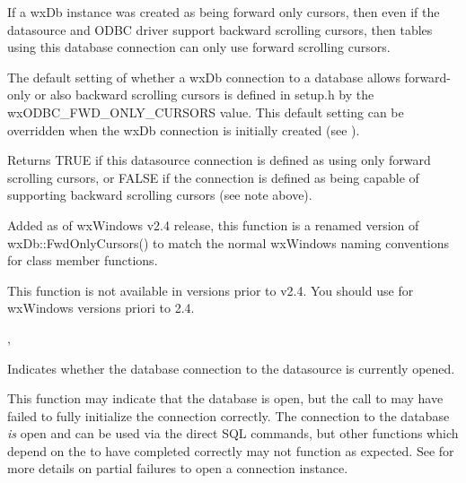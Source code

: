 If a wxDb instance was created as being forward only cursors, then even if
the datasource and ODBC driver support backward scrolling cursors, then
tables using this database connection can only use forward scrolling
cursors.

The default setting of whether a wxDb connection to a database allows
forward-only or also backward scrolling cursors is defined in setup.h by 
the wxODBC_FWD_ONLY_CURSORS value.  This default setting can be overridden
when the wxDb connection is initially created (see ).


Returns TRUE if this datasource connection is defined as using only forward
scrolling cursors, or FALSE if the connection is defined as being capable
of supporting backward scrolling cursors (see note above).


Added as of wxWindows v2.4 release, this function is a renamed version of 
wxDb::FwdOnlyCursors() to match the normal wxWindows naming conventions for 
class member functions.

This function is not available in versions prior to v2.4.  You should use  for wxWindows versions priori to 2.4.


, 


\label{wxdbisopen}


Indicates whether the database connection to the datasource is currently 
opened.


This function may indicate that the database is open, but the call to 
 may have failed to fully initialize the connection
correctly.  The connection to the database {\it is} open and can be used via
the direct SQL commands, but other functions which depend on the 
to have completed correctly may not function as expected.  See 
for more details on partial failures to open a connection instance.


\label{wxdblogerror}


